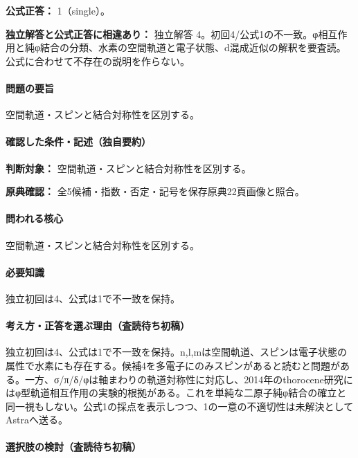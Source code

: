 \textbf{公式正答：} 1（single）。

\par\textbf{独立解答と公式正答に相違あり：} 独立解答 4。初回4/公式1の不一致。φ相互作用と純φ結合の分類、水素の空間軌道と電子状態、d混成近似の解釈を要査読。公式に合わせて不存在の説明を作らない。

\paragraph{問題の要旨} 空間軌道・スピンと結合対称性を区別する。

\paragraph{確認した条件・記述（独自要約）}\mbox{}\par

\noindent\textbf{判断対象：} 空間軌道・スピンと結合対称性を区別する。\par

\noindent\textbf{原典確認：} 全5候補・指数・否定・記号を保存原典22頁画像と照合。\par

\paragraph{問われる核心} 空間軌道・スピンと結合対称性を区別する。

\paragraph{必要知識} 独立初回は4、公式は1で不一致を保持。

\paragraph{考え方・正答を選ぶ理由（査読待ち初稿）} 独立初回は4、公式は1で不一致を保持。n,l,mは空間軌道、スピンは電子状態の属性で水素にも存在する。候補4を多電子にのみスピンがあると読むと問題がある。一方、σ/π/δ/φは軸まわりの軌道対称性に対応し、2014年のthorocene研究にはφ型軌道相互作用の実験的根拠がある。これを単純な二原子純φ結合の確立と同一視もしない。公式1の採点を表示しつつ、1の一意の不適切性は未解決としてAstraへ送る。

\paragraph{選択肢の検討（査読待ち初稿）}\mbox{}\par

